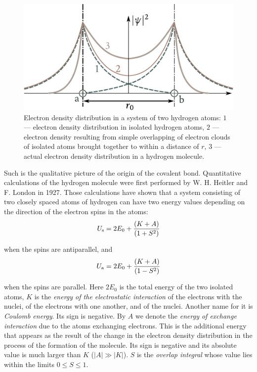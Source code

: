 \begin{figure}[t]
	\begin{center}
		\includegraphics[scale=1]{figures/ch_01/fig_1_6.pdf}
		\caption[]{Electron density distribution in a system of two hydrogen atoms: $1$ --- electron density distribution in isolated hydrogen atoms, $2$ --- electron density resulting from simple overlapping of electron clouds of isolated atoms brought together to within a distance of $r$, $3$ --- actual electron density distribution in a hydrogen molecule.}
		\label{fig:1_6}
	\end{center}
	\vspace{-0.7cm}
\end{figure}

Such is the qualitative picture of the origin of the covalent bond. Quantitative calculations of the hydrogen molecule were first performed by W. H. Heitler and F. London in 1927. Those calculations have shown that a system consisting of two closely spaced atoms of hydrogen can have two energy values depending on the direction of the electron spins in the atoms:
\begin{equation}\label{eq:1_11}
	U_{\text{s}} = 2 E_0 + \frac{(K + A)}{(1 + S^2)}
\end{equation}

\noindent
when the spins are antiparallel, and
\begin{equation}\label{eq:1_12}
	U_{\text{a}} = 2 E_0 + \frac{(K + A)}{(1 - S^2)}
\end{equation}

\noindent
when the spins are parallel. Here $2E_0$ is the total energy of the two isolated atoms, $K$ is the \textit{energy of the electrostatic interaction} of the electrons with the nuclei, of the electrons with one another, and of the nuclei. Another name for it is \textit{Coulomb energy}. Its sign is negative. By $A$ we denote the \textit{energy of exchange interaction} due to the atoms exchanging electrons. This is the additional energy that appears as the result of the change in the electron density distribution in the process of the formation of the molecule. Its sign is negative and its absolute value is much larger than $K$ ($|A|\gg |K|$). $S$ is the \textit{overlap integral} whose value lies within the limits $0\leqslant S\leqslant 1$.

